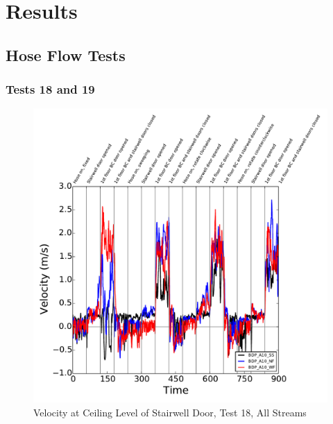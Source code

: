 \documentclass[12pt,oneside]{book}
\begin{document}
\clearpage

\chapter{Results}
\label{chap:Results}

\section{Hose Flow Tests}

\subsection{Tests 18 and 19}


\begin{figure}[!ht]
\includegraphics[width=6in]{../../Figures/Hose_Test_Figures/Test_18_West_063014BDP_A10_8_All_Streams}
\caption{Velocity at Ceiling Level of Stairwell Door, Test 18, All Streams}
\label{fig:Test_18_West_063014_SS_BDP_A10}
\end{figure}
\end{document}
